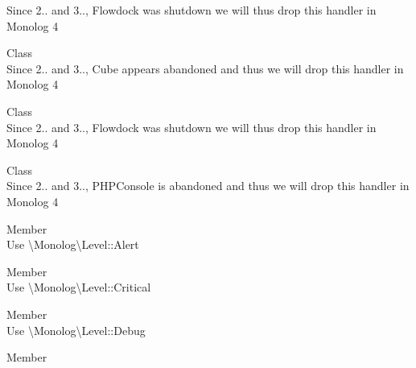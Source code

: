 \begin{DoxyRefList}
%
Since 2.. and 3.., Flowdock was shutdown we will thus drop this handler in Monolog 4  
\item[Class \doxylink{class_monolog_1_1_handler_1_1_cube_handler}{Monolog\textbackslash{}Handler\textbackslash{}Cube\+Handler} ]\hfill \\
\label{deprecated__deprecated000115}%
%
Since 2.. and 3.., Cube appears abandoned and thus we will drop this handler in Monolog 4  
\item[Class \doxylink{class_monolog_1_1_handler_1_1_flowdock_handler}{Monolog\textbackslash{}Handler\textbackslash{}Flowdock\+Handler} ]\hfill \\
\label{deprecated__deprecated000116}%
%
Since 2.. and 3.., Flowdock was shutdown we will thus drop this handler in Monolog 4  
\item[Class \doxylink{class_monolog_1_1_handler_1_1_p_h_p_console_handler}{Monolog\textbackslash{}Handler\textbackslash{}PHPConsole\+Handler} ]\hfill \\
\label{deprecated__deprecated000117}%
%
Since 2.. and 3.., PHPConsole is abandoned and thus we will drop this handler in Monolog 4  
\item[Member \doxylink{class_monolog_1_1_logger_af74503fc81aaad651239aca88b335fca}{Monolog\textbackslash{}Logger\+::ALERT} ]\hfill \\
\label{deprecated__deprecated000124}%
%
Use \textbackslash{}\+Monolog\textbackslash{}\+Level\+::\+Alert  
\item[Member \doxylink{class_monolog_1_1_logger_a4d1a1c7785e99dfc31f302b567802004}{Monolog\textbackslash{}Logger\+::CRITICAL} ]\hfill \\
\label{deprecated__deprecated000123}%
%
Use \textbackslash{}\+Monolog\textbackslash{}\+Level\+::\+Critical  
\item[Member \doxylink{class_monolog_1_1_logger_ae2cb6f88fa87e09b1d8c355a2477b9bf}{Monolog\textbackslash{}Logger\+::DEBUG} ]\hfill \\
\label{deprecated__deprecated000118}%
%
Use \textbackslash{}\+Monolog\textbackslash{}\+Level\+::\+Debug  
\item[Member \doxylink{class_monolog_1_1_logger_a0f8af2e6f2bf3b1e0225cdedcbdc76d8}{Monolog\textbackslash{}Logger\+::EMERGENCY} ]\hfill \\

\end{DoxyRefList}
